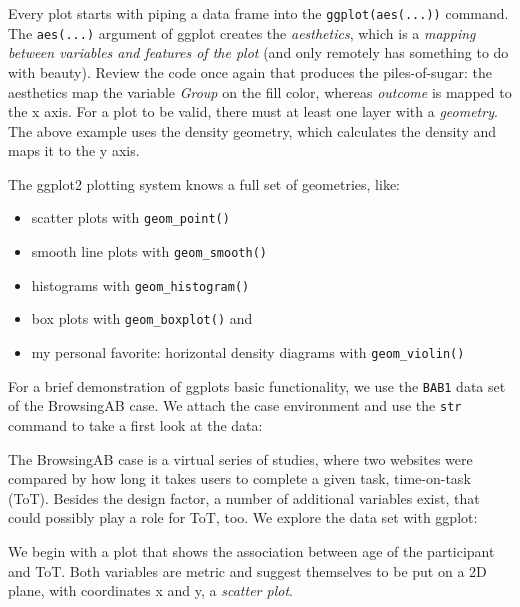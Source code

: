 \documentclass[]{svmono}
\newenvironment{Shaded}{\begin{snugshade}}{\end{snugshade}}
\newcommand{\KeywordTok}[1]{\textcolor[rgb]{0.13,0.29,0.53}{\textbf{#1}}}
\newcommand{\StringTok}[1]{\textcolor[rgb]{0.31,0.60,0.02}{#1}}
\newcommand{\OperatorTok}[1]{\textcolor[rgb]{0.81,0.36,0.00}{\textbf{#1}}}
\newcommand{\NormalTok}[1]{#1}
\providecommand{\tightlist}{%
  \setlength{\itemsep}{0pt}\setlength{\parskip}{0pt}}
\begin{document}
Every plot starts with piping a data frame into the
\texttt{ggplot(aes(...))} command. The \texttt{aes(...)} argument of
ggplot creates the \emph{aesthetics}, which is a \emph{mapping between
variables and features of the plot} (and only remotely has something to
do with beauty). Review the code once again that produces the
piles-of-sugar: the aesthetics map the variable \emph{Group} on the fill
color, whereas \emph{outcome} is mapped to the x axis. For a plot to be
valid, there must at least one layer with a \emph{geometry}. The above
example uses the density geometry, which calculates the density and maps
it to the y axis.

The ggplot2 plotting system knows a full set of geometries, like:

\begin{itemize}
\tightlist
\item
  scatter plots with \texttt{geom\_point()}
\item
  smooth line plots with \texttt{geom\_smooth()}
\item
  histograms with \texttt{geom\_histogram()}
\item
  box plots with \texttt{geom\_boxplot()} and
\item
  my personal favorite: horizontal density diagrams with
  \texttt{geom\_violin()}
\end{itemize}

For a brief demonstration of ggplots basic functionality, we use the
\texttt{BAB1} data set of the BrowsingAB case. We attach the case
environment and use the \texttt{str} command to take a first look at the
data:

\begin{Shaded}
\end{Shaded}

The BrowsingAB case is a virtual series of studies, where two websites
were compared by how long it takes users to complete a given task,
time-on-task (ToT). Besides the design factor, a number of additional
variables exist, that could possibly play a role for ToT, too. We
explore the data set with ggplot:

We begin with a plot that shows the association between age of the
participant and ToT. Both variables are metric and suggest themselves to
be put on a 2D plane, with coordinates x and y, a \emph{scatter plot}.
\end{document}
